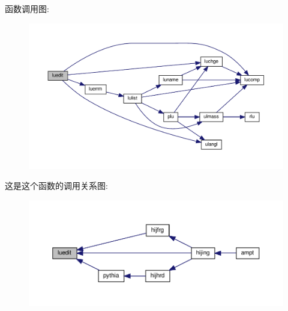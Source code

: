 函数调用图\+:
\nopagebreak
\begin{figure}[H]
\begin{center}
\leavevmode
\includegraphics[width=350pt]{luedit_8f90_aedec58b9b55eeb115502143342210e29_cgraph}
\end{center}
\end{figure}
这是这个函数的调用关系图\+:
\nopagebreak
\begin{figure}[H]
\begin{center}
\leavevmode
\includegraphics[width=350pt]{luedit_8f90_aedec58b9b55eeb115502143342210e29_icgraph}
\end{center}
\end{figure}

